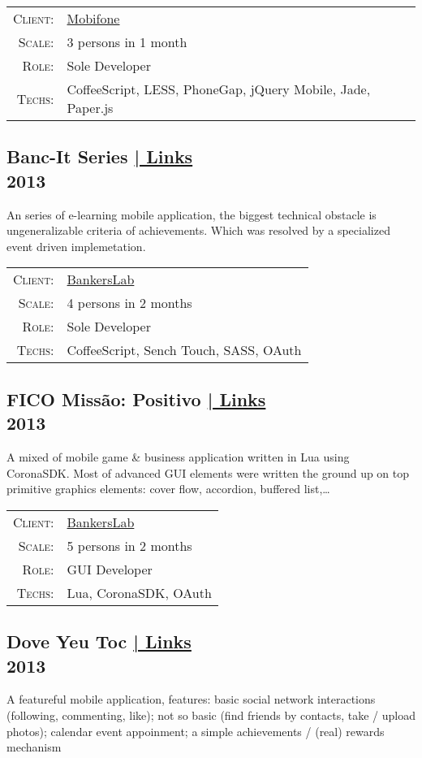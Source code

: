 \documentclass[a4paper,10pt]{article}
\begin{document}
\begin{tabular}{rl}
    \textsc{Client:} & \href{http://www.mobifone.com.vn/}{Mobifone}\\
    \textsc{Scale:} & 3 persons in 1 month\\
    \textsc{Role:} & Sole Developer\\
    \textsc{Techs:} & CoffeeScript, LESS, PhoneGap, jQuery Mobile, Jade, Paper.js\\
\end{tabular}

\subsection*{Banc-It Series \hfill \footnotesize {\hyperlink{bancit-links}{| Links}}\\\small 2013}
An series of e-learning mobile application, the biggest technical obstacle is ungeneralizable criteria of achievements. Which was resolved by a specialized event driven implemetation.

\begin{tabular}{rl}
    \textsc{Client:} & \href{http://bankerslab.com/}{BankersLab}\\
    \textsc{Scale:} & 4 persons in 2 months\\
    \textsc{Role:} & Sole Developer\\
    \textsc{Techs:} & CoffeeScript, Sench Touch, SASS, OAuth
\end{tabular}

\subsection*{FICO Missão: Positivo \hfill \footnotesize {\hyperlink{bancit-links}{| Links}}\\\small 2013}
A mixed of mobile game \& business application written in Lua using CoronaSDK. Most of advanced GUI elements were written the ground up on top primitive graphics elements: cover flow, accordion, buffered list,\ldots

\begin{tabular}{rl}
    \textsc{Client:} & \href{http://bankerslab.com/}{BankersLab}\\
    \textsc{Scale:} & 5 persons in 2 months\\
    \textsc{Role:} & GUI Developer\\
    \textsc{Techs:} & Lua, CoronaSDK, OAuth
\end{tabular}

\subsection*{Dove Yeu Toc \hfill \footnotesize {\hyperlink{dove-links}{| Links}}\\\small 2013}
A featureful mobile application, features: basic social network interactions (following, commenting, like); not so basic (find friends by contacts, take / upload photos); calendar event appoinment; a simple achievements / (real) rewards mechanism
\end{document}
